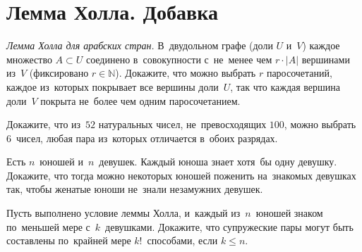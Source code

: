 
\section*{Лемма Холла. Добавка}



\begingroup
    \def\abs#1{\lvert #1 \rvert}

\begin{problems}

\item
\emph{Лемма Холла для арабских стран.}
В~двудольном графе (доли $U$ и~$V$) каждое множество $A \subset U$ соединено
в~совокупности с~не~менее чем $r \cdot \abs{A}$ вершинами из~$V$
(фиксировано $r \in \mathbb{N}$).
Докажите, что можно выбрать $r$ паросочетаний, каждое из~которых покрывает все
вершины доли~$U$, так что каждая вершина доли~$V$ покрыта не~более чем одним
паросочетанием.

\item
Докажите, что из~$52$ натуральных чисел, не~превосходящих $100$, можно выбрать
$6$~чисел, любая пара из~которых отличается в~обоих разрядах.

\item
Есть $n$~юношей и~$n$~девушек.
Каждый юноша знает хотя~бы одну девушку.
Докажите, что тогда можно некоторых юношей поженить на~знакомых девушках так,
чтобы женатые юноши не~знали незамужних девушек.

\item
Пусть выполнено условие леммы Холла, и~каждый из~$n$~юношей знаком по~меньшей
мере с~$k$~девушками.
Докажите, что супружеские пары могут быть составлены по~крайней мере
$k!$~способами, если $k \leq n$.

\end{problems}

\endgroup %


